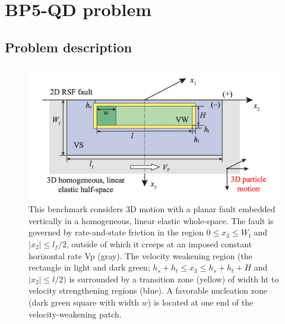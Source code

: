 \section{BP5-QD problem}
\subsection{Problem description}
\begin{figure}
    \centering
    \includegraphics[width=\linewidth]{figures/BP5-figure.png}
    \caption{This benchmark considers 3D motion with a planar fault embedded vertically in a homogeneous, linear elastic whole-space. The fault is governed by rate-and-state friction in the region $0 \leq x_3 \leq W_\text{f}$ and $|x_2| \leq l_f/2$, outside of which it creeps at an imposed constant horizontal rate Vp (gray). The velocity weakening region (the rectangle in light and dark green; $h_s + h_t \leq x_3 \leq h_s + h_t + H$ and $|x_2| \leq l/2)$ is surrounded by a transition zone (yellow) of width ht to velocity strengthening regions (blue). A favorable nucleation zone (dark green square with width $w$) is located at one end of the velocity-weakening patch. \cite{jiang2020seas}}
    \label{fig:BP5-figure}
\end{figure}



